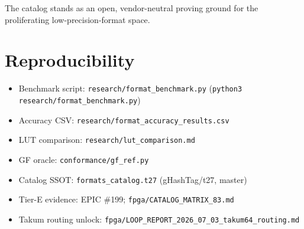 \documentclass[11pt]{article}
\begin{document}
The catalog stands as an open, vendor-neutral proving ground for the
proliferating low-precision-format space.

\section*{Reproducibility}

\begin{itemize}[leftmargin=*]
\item Benchmark script: \texttt{research/format\_benchmark.py}
      (\texttt{python3 research/format\_benchmark.py})
\item Accuracy CSV: \texttt{research/format\_accuracy\_results.csv}
\item LUT comparison: \texttt{research/lut\_comparison.md}
\item GF oracle: \texttt{conformance/gf\_ref.py}
\item Catalog SSOT: \texttt{formats\_catalog.t27} (gHashTag/t27, master)
\item Tier-E evidence: EPIC \#199; \texttt{fpga/CATALOG\_MATRIX\_83.md}
\item Takum routing unlock:
      \texttt{fpga/LOOP\_REPORT\_2026\_07\_03\_takum64\_routing.md}
\end{itemize}



\end{document}
